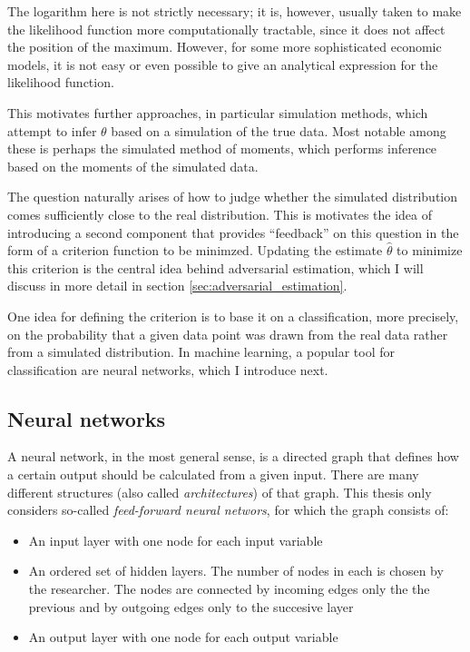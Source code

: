 The logarithm here is not strictly necessary; it is, however, usually taken to make the likelihood function more computationally tractable, since it does not affect the position of the maximum.
However, for some more sophisticated economic models, it is not easy or even possible to give an analytical expression for the likelihood function.

This motivates further approaches, in particular simulation methods, which attempt to infer $\theta$ based on a simulation of the true data.
Most notable among these is perhaps the simulated method of moments, which performs inference based on the moments of the simulated data. %

The question naturally arises of how to judge whether the simulated distribution comes sufficiently close to the real distribution.
This is motivates the idea of introducing a second component that provides ``feedback'' on this question in the form of a criterion function to be minimzed.
Updating the estimate $\hat{\theta}$ to minimize this criterion is the central idea behind adversarial estimation, which I will discuss in more detail in section \ref{sec:adversarial_estimation}.

One idea for defining the criterion is to base it on a classification, more precisely, on the probability that a given data point was drawn from the real data rather from a simulated distribution.
In machine learning, a popular tool for classification are neural networks, which I introduce next.

\subsection{Neural networks}
\label{sec:neural_networks}

A neural network, in the most general sense, is a directed graph that defines how a certain output should be calculated from a given input.
There are many different structures (also called \textit{architectures}) of that graph.
This thesis only considers so-called \textit{feed-forward neural networs}, for which the graph consists of:

\begin{itemize}
    \item An input layer with one node for each input variable
    \item An ordered set of hidden layers. The number of nodes in each is chosen by the researcher. The nodes are connected by incoming edges only the the previous and by outgoing edges only to the succesive layer
    \item An output layer with one node for each output variable
\end{itemize}

